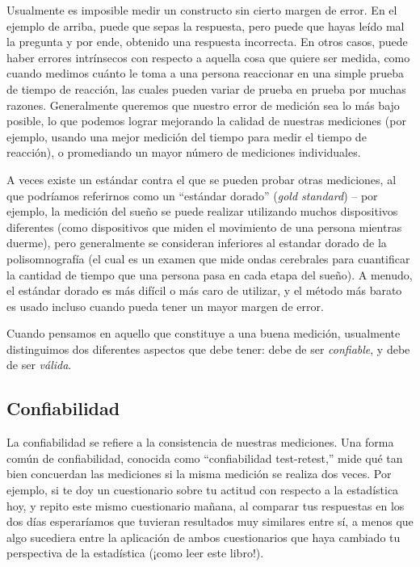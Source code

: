 \documentclass[
  12pt,
]{book}
\begin{document}
Usualmente es imposible medir un constructo sin cierto margen de error. En el ejemplo de arriba, puede que sepas la respuesta, pero puede que hayas leído mal la pregunta y por ende, obtenido una respuesta incorrecta. En otros casos, puede haber errores intrínsecos con respecto a aquella cosa que quiere ser medida, como cuando medimos cuánto le toma a una persona reaccionar en una simple prueba de tiempo de reacción, las cuales pueden variar de prueba en prueba por muchas razones. Generalmente queremos que nuestro error de medición sea lo más bajo posible, lo que podemos lograr mejorando la calidad de nuestras mediciones (por ejemplo, usando una mejor medición del tiempo para medir el tiempo de reacción), o promediando un mayor número de mediciones individuales.

A veces existe un estándar contra el que se pueden probar otras mediciones, al que podríamos referirnos como un ``estándar dorado'' (\emph{gold standard}) -- por ejemplo, la medición del sueño se puede realizar utilizando muchos dispositivos diferentes (como dispositivos que miden el movimiento de una persona mientras duerme), pero generalmente se consideran inferiores al estandar dorado de la polisomnografía (el cual es un examen que mide ondas cerebrales para cuantificar la cantidad de tiempo que una persona pasa en cada etapa del sueño). A menudo, el estándar dorado es más difícil o más caro de utilizar, y el método más barato es usado incluso cuando pueda tener un mayor margen de error.

Cuando pensamos en aquello que constituye a una buena medición, usualmente distinguimos dos diferentes aspectos que debe tener: debe de ser \emph{confiable}, y debe de ser \emph{válida}.

\hypertarget{confiabilidad}{%
\subsection{Confiabilidad}\label{confiabilidad}}

La confiabilidad se refiere a la consistencia de nuestras mediciones. Una forma común de confiabilidad, conocida como ``confiabilidad test-retest,'' mide qué tan bien concuerdan las mediciones si la misma medición se realiza dos veces. Por ejemplo, si te doy un cuestionario sobre tu actitud con respecto a la estadística hoy, y repito este mismo cuestionario mañana, al comparar tus respuestas en los dos días esperaríamos que tuvieran resultados muy similares entre sí, a menos que algo sucediera entre la aplicación de ambos cuestionarios que haya cambiado tu perspectiva de la estadística (¡como leer este libro!).
\end{document}
